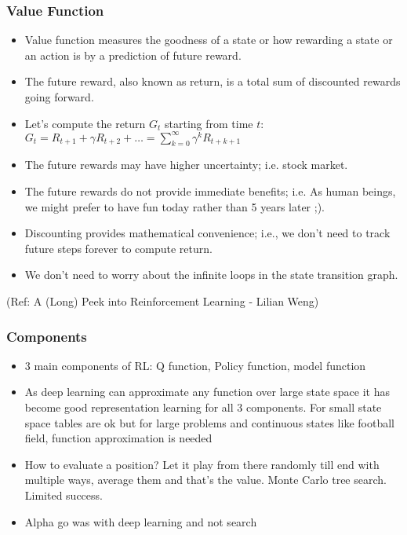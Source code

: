 \begin{frame}[fragile]\frametitle{Value Function}


\begin{itemize}
\item Value function measures the goodness of a state or how rewarding a state or an action is by a
prediction of future reward. 
\item The future reward, also known as return, is a total sum of discounted rewards going forward. 
\item Let’s compute the return $G_t$ starting from time $t$: $G_t = R_{t+1} + \gamma R_{t+2} + \ldots = \sum_{k=0}^{\infty} \gamma^kR_{t+k+1}$
\item The future rewards may have higher uncertainty; i.e. stock market.
\item The future rewards do not provide immediate benefits; i.e. As human beings, we might prefer to
have fun today rather than 5 years later ;).
\item Discounting provides mathematical convenience; i.e., we don’t need to track future steps forever to
compute return.
\item We don’t need to worry about the infinite loops in the state transition graph.
\end{itemize}



{\tiny (Ref: A (Long) Peek into Reinforcement Learning - Lilian Weng)}


\end{frame}

\begin{frame}[fragile]\frametitle{Components}


\begin{itemize}
\item 3 main components of RL: Q function, Policy function, model function
\item As deep learning can approximate any function over large state space it has become good representation learning for all 3 components. For small state space tables are ok but for large problems and continuous states like football field, function approximation is needed
\item How to evaluate a position? Let it play from there randomly till end with multiple ways, average them and that's the value. Monte Carlo tree search. Limited success.
\item Alpha go was with deep learning and not search

\end{itemize}

\end{frame}

